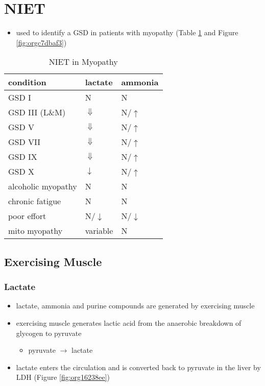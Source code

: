 \documentclass[12pt]{scrartcl}
\begin{document}
\section{NIET}
\label{sec:org37f439d}
\begin{itemize}
\item used to identify a GSD in patients with myopathy (Table
\ref{tab:orgd8f6441} and Figure \ref{fig:orgc7dbaf3})
\end{itemize}

\begin{table}[htbp]
\caption{\label{tab:orgd8f6441}NIET in Myopathy}
\centering
\begin{tabular}{lll}
condition & lactate & ammonia\\
\hline
GSD I & N & N\\
GSD III (L\&M) & \(\Downarrow\) & N/\(\uparrow\)\\
GSD V & \(\Downarrow\) & N/\(\uparrow\)\\
GSD VII & \(\Downarrow\) & N/\(\uparrow\)\\
GSD IX & \(\Downarrow\) & N/\(\uparrow\)\\
GSD X & \(\downarrow\) & N/\(\uparrow\)\\
alcoholic myopathy & N & N\\
chronic fatigue & N & N\\
poor effort & N/\(\downarrow\) & N/\(\downarrow\)\\
mito myopathy & variable & N\\
\end{tabular}
\end{table}

\subsection{Exercising Muscle}
\label{sec:org9ca4e33}
\subsubsection{Lactate}
\label{sec:org46825c2}
\begin{itemize}
\item lactate, ammonia and purine compounds are generated by exercising muscle
\item exercising muscle generates lactic acid from the anaerobic breakdown
of glycogen to pyruvate
\begin{itemize}
\item pyruvate \(\to\) lactate
\end{itemize}
\item lactate enters the circulation and is converted back to pyruvate in
the liver by LDH (Figure \ref{fig:org16238ee})
\end{itemize}
\end{document}
